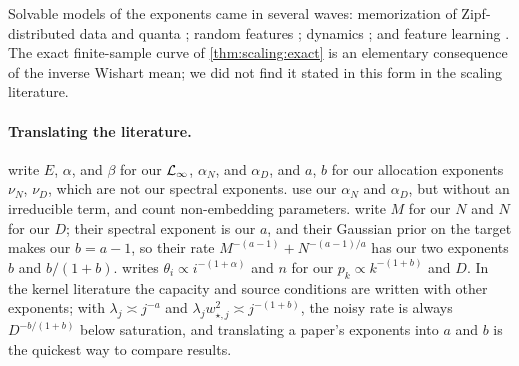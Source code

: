 \begin{refsection}
Solvable models of the exponents came in several waves: memorization of Zipf-distributed data \parencite{Hutter2021} and quanta \parencite{MichaudEtAl2023}; random features \parencite{MaloneyEtAl2022,BahriEtAl2024}; dynamics \parencite{BordelonEtAl2024,PaquetteEtAl2024,LinEtAl2024}; and feature learning \parencite{BordelonEtAl2025}. The exact finite-sample curve of \cref{thm:scaling:exact} is an elementary consequence of the inverse Wishart mean; we did not find it stated in this form in the scaling literature.

\paragraph{Translating the literature.} \Textcite{HoffmannEtAl2022} write $E$, $\alpha$, and $\beta$ for our $\mathcal{L}_\infty$, $\alpha_N$, and $\alpha_D$, and $a$, $b$ for our allocation exponents $\nu_N$, $\nu_D$, which are not our spectral exponents. \Textcite{KaplanEtAl2020} use our $\alpha_N$ and $\alpha_D$, but without an irreducible term, and count non-embedding parameters. \Textcite{LinEtAl2024} write $M$ for our $N$ and $N$ for our $D$; their spectral exponent is our $a$, and their Gaussian prior on the target makes our $b=a-1$, so their rate $M^{-(a-1)}+N^{-(a-1)/a}$ has our two exponents $b$ and $b/(1+b)$. \Textcite{Hutter2021} writes $\theta_i\propto i^{-(1+\alpha)}$ and $n$ for our $p_k\propto k^{-(1+b)}$ and $D$. In the kernel literature \parencite{CaponnettoDeVito2007,CuiEtAl2021} the capacity and source conditions are written with other exponents; with $\lambda_j\asymp j^{-a}$ and $\lambda_jw_{\star,j}^2\asymp j^{-(1+b)}$, the noisy rate is always $D^{-b/(1+b)}$ below saturation, and translating a paper's exponents into $a$ and $b$ is the quickest way to compare results.

\printchapterbib
\end{refsection}
